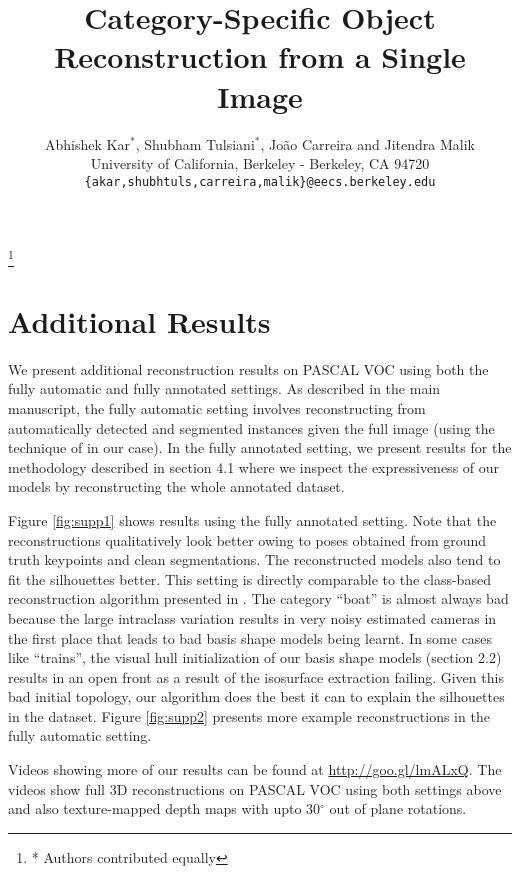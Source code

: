 \documentclass[10pt,twocolumn,letterpaper]{article}
\newcommand\blfootnote[1]{%
\begingroup
\renewcommand\thefootnote{}\footnote{#1}%
\addtocounter{footnote}{-1}%
\endgroup
}
\begin{document}
\title{Category-Specific Object Reconstruction from a Single Image}
\author{Abhishek Kar$^*$, Shubham Tulsiani$^*$, Jo\~{a}o Carreira and Jitendra Malik\\
University of California, Berkeley - Berkeley, CA 94720\\
{\tt\small \{akar,shubhtuls,carreira,malik\}@eecs.berkeley.edu}}

\maketitle
\blfootnote{* Authors contributed equally}

\section{Additional Results}
We present additional reconstruction results on PASCAL VOC using both the fully automatic and fully annotated settings. As described in the main manuscript, the fully automatic setting involves reconstructing from automatically detected and segmented instances given the full image (using the technique of \cite{BharathECCV2014} in our case). In the fully annotated setting, we present results for the methodology described in section 4.1 where we inspect the expressiveness of our models by reconstructing the whole annotated dataset. 

Figure \ref{fig:supp1} shows results using the fully annotated setting. Note that the reconstructions qualitatively look better owing to poses obtained from ground truth keypoints and clean segmentations. The reconstructed models also tend to fit the silhouettes better. This setting is directly comparable to the class-based reconstruction algorithm presented in \cite{carvi14}. The category ``boat'' is almost always bad because the large intraclass variation results in very noisy estimated cameras in the first place that leads to bad basis shape models being learnt. In some cases like ``trains'', the visual hull initialization of our basis shape models (section 2.2) results in an open front as a result of the isosurface extraction failing. Given this bad initial topology, our algorithm does the best it can to explain the silhouettes in the dataset. Figure \ref{fig:supp2} presents more example reconstructions in the fully automatic setting.

Videos showing more of our results can be found at \url{http://goo.gl/lmALxQ}. The videos show full 3D reconstructions on PASCAL VOC using both settings above and also texture-mapped depth maps with upto 30$^{\circ}$ out of plane rotations.
\end{document}
